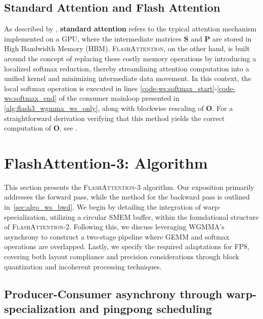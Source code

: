 \subsection{Standard Attention and Flash Attention} As described by \citet{dao2022flashattention}, \textbf{standard attention} refers to the typical attention mechanism implemented on a GPU, where the intermediate matrices $\mathbf{S}$ and $\mathbf{P}$ are stored in High Bandwidth Memory (HBM). \textsc{FlashAttention}, on the other hand, is built around the concept of replacing these costly memory operations by introducing a localized softmax reduction, thereby streamlining attention computation into a unified kernel and minimizing intermediate data movement. In this context, the local softmax operation is executed in lines \ref{code-ws:softmax_start}-\ref{code-ws:softmax_end} of the consumer mainloop presented in \cref{alg:flash3_wgmma_ws_only}, along with blockwise rescaling of $\mathbf{O}$. For a straightforward derivation verifying that this method yields the correct computation of $\mathbf{O}$, see \cite[\S 2.3.1]{dao2023flashattention2}.

\section{FlashAttention-3: Algorithm}
\label{sec:algo}

This section presents the \textsc{FlashAttention-3} algorithm. Our exposition primarily addresses the forward pass, while the method for the backward pass is outlined in~\cref{sec:algo_ws_bwd}. We begin by detailing the integration of warp-specialization, utilizing a circular SMEM buffer, within the foundational structure of \textsc{FlashAttention-2}. Following this, we discuss leveraging WGMMA’s asynchrony to construct a two-stage pipeline where GEMM and softmax operations are overlapped. Lastly, we specify the required adaptations for FP8, covering both layout compliance and precision considerations through block quantization and incoherent processing techniques.

\subsection{Producer-Consumer asynchrony through warp-specialization and pingpong scheduling}
\label{sec:algo_ws}

